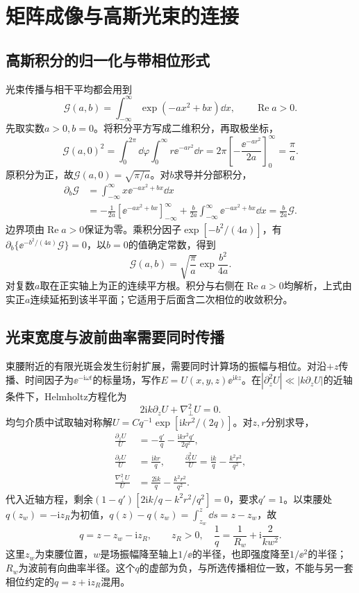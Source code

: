 \section{矩阵成像与高斯光束的连接}
\subsection{高斯积分的归一化与带相位形式}
光束传播与相干平均都会用到
\[
 \mathcal G(a,b)=\int_{-\infty}^{\infty}\exp(-ax^2+bx)\dd x,
 \qquad \operatorname{Re}a>0.
\]
先取实数$a>0,b=0$。将积分平方写成二维积分，再取极坐标，
\[
 \mathcal G(a,0)^2=\int_0^{2\pi}\dd\varphi\int_0^\infty
 r\ee^{-ar^2}\dd r
 =2\pi\left[-\frac{\ee^{-ar^2}}{2a}\right]_0^\infty=\frac\pi a.
\]
原积分为正，故$\mathcal G(a,0)=\sqrt{\pi/a}$。对$b$求导并分部积分，
\begin{align*}
 \partial_b\mathcal G
 &=\int_{-\infty}^{\infty}x\ee^{-ax^2+bx}\dd x\\
 &=-\frac1{2a}[\ee^{-ax^2+bx}]_{-\infty}^{\infty}
 +\frac b{2a}\int_{-\infty}^{\infty}\ee^{-ax^2+bx}\dd x
 =\frac b{2a}\mathcal G.
\end{align*}
边界项由$\operatorname{Re}a>0$保证为零。乘积分因子$\exp[-b^2/(4a)]$，有$\partial_b\{\ee^{-b^2/(4a)}\mathcal G\}=0$，以$b=0$的值确定常数，得到
\begin{equation}\label{eq:o1gaussintegral}
 \mathcal G(a,b)=\sqrt{\frac\pi a}\exp\frac{b^2}{4a}.
\end{equation}
对复数$a$取在正实轴上为正的连续平方根。积分与右侧在$\operatorname{Re}a>0$均解析，上式由实正$a$连续延拓到该半平面；它适用于后面含二次相位的收敛积分。

\subsection{光束宽度与波前曲率需要同时传播}
束腰附近的有限光斑会发生衍射扩展，需要同时计算场的振幅与相位。对沿$+z$传播、时间因子为$\ee^{-\mathrm i\omega t}$的标量场，写作$E=U(x,y,z)\ee^{\mathrm ikz}$。在$|\partial_z^2U|\ll|k\partial_zU|$的近轴条件下，Helmholtz方程化为
\[
 2\mathrm ik\partial_zU+\nabla_\perp^2U=0.
\]
均匀介质中试取轴对称解$U=Cq^{-1}\exp[\mathrm ikr^2/(2q)]$。对$z,r$分别求导，
\begin{align*}
 \frac{\partial_zU}{U}&=-\frac{q'}q-\frac{\mathrm ikr^2q'}{2q^2},\\
 \frac{\partial_rU}{U}&=\frac{\mathrm ikr}q,\qquad
 \frac{\partial_r^2U}{U}=\frac{\mathrm ik}q-\frac{k^2r^2}{q^2},\\
 \frac{\nabla_\perp^2U}{U}&=\frac{2\mathrm ik}q-\frac{k^2r^2}{q^2}.
\end{align*}
代入近轴方程，剩余$(1-q')[2\mathrm ik/q-k^2r^2/q^2]=0$，要求$q'=1$。以束腰处$q(z_w)=-\mathrm iz_R$为初值，$q(z)-q(z_w)=\int_{z_w}^z\dd s=z-z_w$，故
\[
 q=z-z_w-\mathrm iz_R,\qquad z_R>0,
 \quad\frac1q=\frac1{R_w}+\mathrm i\frac2{kw^2}.
\]
这里$z_w$为束腰位置，$w$是场振幅降至轴上$1/\ee$的半径，也即强度降至$1/\ee^2$的半径；$R_w$为波前有向曲率半径。这个$q$的虚部为负，与所选传播相位一致，不能与另一套相位约定的$q=z+\mathrm iz_R$混用。

